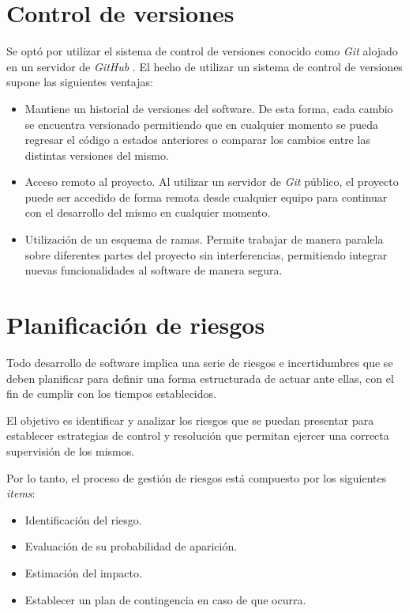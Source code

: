 \section{Control de versiones}
Se optó por utilizar el sistema de control de versiones conocido como \textit{Git} \parencite{gitref} alojado en un servidor de \textit{GitHub} \parencite{githubref}. El hecho de utilizar un sistema de control de versiones supone las siguientes ventajas:

\begin{itemize}
	\item Mantiene un historial de versiones del software. De esta forma, cada cambio se encuentra versionado permitiendo que en cualquier momento se pueda regresar el código a estados anteriores o comparar los cambios entre las distintas versiones del mismo.   
	\item Acceso remoto al proyecto. Al utilizar un servidor de \textit{Git} público, el proyecto puede ser accedido de forma remota desde cualquier equipo para continuar con el desarrollo del mismo en cualquier momento.
	\item Utilización de un esquema de ramas. Permite trabajar de manera paralela sobre diferentes partes del proyecto sin interferencias, permitiendo integrar nuevas funcionalidades al software de manera segura.
\end{itemize}

\section{Planificación de riesgos}
Todo desarrollo de software implica una serie de riesgos e incertidumbres que se deben planificar para definir una forma estructurada de actuar ante ellas, con el fin de cumplir con los tiempos establecidos.
  
El objetivo es identificar y analizar los riesgos que se puedan presentar para establecer estrategias de control y resolución que permitan ejercer una correcta supervisión de los mismos.

Por lo tanto, el proceso de gestión de riesgos está compuesto por los siguientes \textit{items}:

\begin{itemize}
	\item Identificación del riesgo.
  \item Evaluación de su probabilidad de aparición.
  \item Estimación del impacto.
  \item Establecer un plan de contingencia en caso de que ocurra.
\end{itemize}

